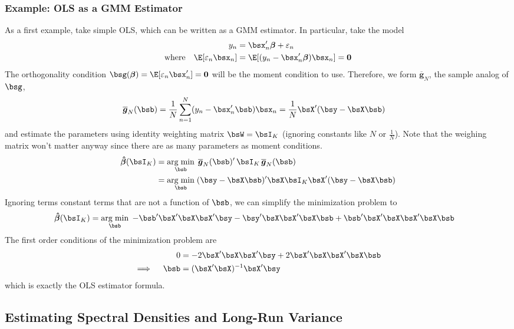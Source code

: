 \documentclass[12pt]{article}
\theoremstyle{plain}
\theoremstyle{definition}
\theoremstyle{remark}
\newcommand{\bsbeta}{\boldsymbol{\beta}}
\newcommand{\bshatbeta}{\boldsymbol{\hat{\beta}}}
\newcommand{\bsbarg}{\boldsymbol{\overline{g}}}
\renewcommand{\bso}{\boldsymbol{0}}
\DeclareMathOperator*{\argmin}{arg\;min}
\newcommand{\sumnN}{\sum^N_{n=1}}
\begin{document}
\clearpage
\subsubsection{Example: OLS as a GMM Estimator}

As a first example, take simple OLS, which can be written as a GMM
estimator. In particular, take the model
\begin{align*}
  y_n &= \bsx_n' \bsbeta + \varepsilon_n \\
  \text{where} \quad
  \E[\varepsilon_n\bsx_n] &=
  \E[(y_n-\bsx_n'\bsbeta)\bsx_n] = \bso
\end{align*}
The orthogonality condition $\bsg(\bsbeta)=\E[\varepsilon_n\bsx_n']=\bso$
will be the moment condition to use. Therefore, we form $\bsbarg_N$, the
sample analog of $\bsg$,
\begin{align*}
  \bsbarg_N(\bsb) &= \frac{1}{N}\sumnN (y_n-\bsx_n'\bsb)\bsx_n
  = \frac{1}{N}\bsX'(\bsy - \bsX\bsb)
\end{align*}
and estimate the parameters using identity weighting matrix $\bsW =
\bsI_K$ (ignoring constants like $N$ or $\frac{1}{N}$). Note that the
weighing matrix won't matter anyway since there are as many parameters
as moment conditions.
\begin{align*}
  \bshatbeta(\bsI_K)
  &= \argmin_{\bsb} \; \bsbarg_N(\bsb)' \, \bsI_K \, \bsbarg_N(\bsb) \\
  &= \argmin_{\bsb} \;
    (\bsy - \bsX\bsb)'\bsX \bsI_K \bsX'(\bsy - \bsX\bsb)
\end{align*}
Ignoring terms constant terms that are not a function of $\bsb$, we can
simplify the minimization problem to
\begin{align*}
  \bshatbeta(\bsI_K)
  &= \argmin_{\bsb} \;
    -\bsb'\bsX'\bsX \bsX'\bsy
    - \bsy'\bsX \bsX'\bsX\bsb + \bsb'\bsX'\bsX \bsX'\bsX\bsb
\end{align*}
The first order conditions of the minimization problem are
\begin{align*}
  0 &=
  -2\bsX'\bsX \bsX'\bsy
  + 2\bsX'\bsX \bsX'\bsX\bsb \\
  \implies\quad
  \bsb
  &= (\bsX'\bsX)^{-1} \bsX'\bsy
\end{align*}
which is exactly the OLS estimator formula.


\clearpage
\subsection{Estimating Spectral Densities and Long-Run Variance}
\end{document}

